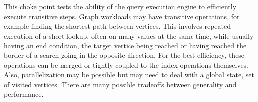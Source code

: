 
This choke point tests the ability of the query execution engine to efficiently
execute transitive steps. Graph workloads may have transitive operations, for
example finding the shortest path between vertices. This involves repeated execution
of a short lookup, often on many values at the same time, while usually having
an end condition, \eg the target vertice being reached or having reached the border
of a search going in the opposite direction. For the best efficiency, these
operations can be merged or tightly coupled to the index operations themselves.
Also, parallelization may be possible but may need to deal with a global state,
\eg set of visited vertices. There are many possible tradeoffs between generality
and performance.


